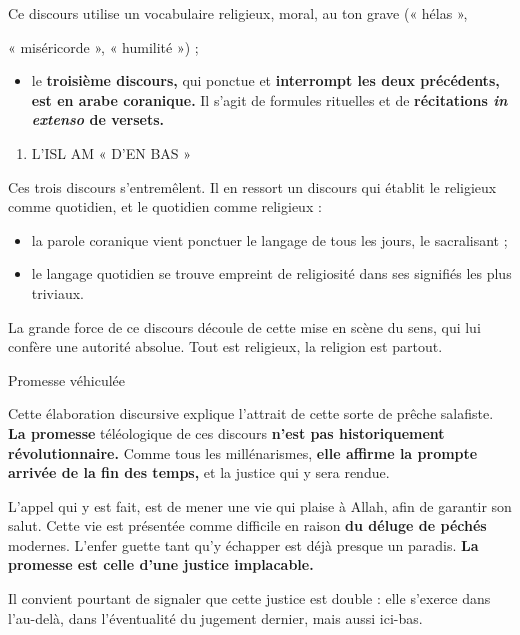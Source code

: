 Ce discours utilise un vocabulaire religieux, moral, au ton grave («
hélas »,

« miséricorde », « humilité ») ;


\begin{itemize}
\item
  le \textbf{troisième discours,} qui ponctue et \textbf{interrompt les
  deux précédents, est en arabe coranique.} Il s'agit de formules
  rituelles et de \textbf{récitations \emph{in extenso} de versets.}
\end{itemize}

\begin{enumerate}
\def\labelenumi{\Roman{enumi}.}
\setcounter{enumi}{2}
\item
  L'ISL AM « D'EN BAS »
\end{enumerate}


Ces trois discours s'entremêlent. Il en ressort un discours qui établit
le religieux comme quotidien, et le quotidien comme religieux :


\begin{itemize}
\item
  la parole coranique vient ponctuer le langage de tous les jours, le
  sacralisant ;
\item
  le langage quotidien se trouve empreint de religiosité dans ses
  signifiés les plus triviaux.
\end{itemize}


La grande force de ce discours découle de cette mise en scène du sens,
qui lui confère une autorité absolue. Tout est religieux, la religion
est partout.


Promesse véhiculée


Cette élaboration discursive explique l'attrait de cette sorte de prêche
salafiste. \textbf{La promesse} téléologique de ces discours
\textbf{n'est pas historiquement révolutionnaire.} Comme tous les
millénarismes, \textbf{elle affirme la prompte arrivée de la fin des
temps,} et la justice qui y sera rendue.

L'appel qui y est fait, est de mener une vie qui plaise à Allah, afin de
garantir son salut. Cette vie est présentée comme difficile en raison
\textbf{du déluge de péchés} modernes. L'enfer guette tant qu'y échapper
est déjà presque un paradis. \textbf{La promesse est celle d'une justice
implacable.}

Il convient pourtant de signaler que cette justice est double : elle
s'exerce dans l'au-delà, dans l'éventualité du jugement dernier, mais
aussi ici-bas.

